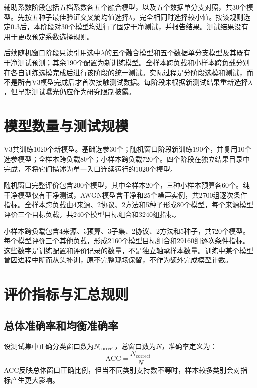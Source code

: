 \documentclass[UTF8,12pt,openany,twoside]{ctexbook}
\numberwithin{equation}{chapter}
\begin{document}
辅助系数阶段包括五档系数各五个融合模型，以及五个数据单分支对照，共30个模型。先按五种子最佳验证交叉熵均值选择\ensuremath{\lambda}，完全相同时选择较小值。按该规则选定0.3后，本阶段对30个模型均进行了固定干净测试，并报告结果。测试结果没有用于更改预定系数选择规则。

后续随机窗口阶段只读引用选中\ensuremath{\lambda}的五个融合模型和五个数据单分支模型及其既有干净测试预测；其余190个配置为新训练模型。全样本跨负载和小样本跨负载分别在各自训练选模完成后进行该阶段的统一测试。实际过程是分阶段选模和测试，而不是所有V3模型完成后才首次接触测试数据。每阶段未根据新测试结果重新选择\ensuremath{\lambda}，但早期测试曝光仍应作为研究限制披露。

\section{模型数量与测试规模}\label{ux6a21ux578bux6570ux91cfux4e0eux6d4bux8bd5ux89c4ux6a21}

V3共训练1020个新模型。基础选参30个；随机窗口阶段新训练190个，并复用10个选参模型；全样本跨负载80个；小样本跨负载720个。四个阶段在独立结果目录中完成，不将它们描述为单一入口连续运行的1020个模型。

随机窗口完整评价包含200个模型，其中全样本20个，三种小样本预算各60个。纯干净模型仅有干净测试，AWGN模型含干净和25个噪声实例，共2700组逐次条件指标。全样本跨负载由4来源、2协议、2方法和5种子形成80个模型，每个来源模型评价三个目标负载，共240个模型目标组合和3240组指标。

小样本跨负载包含4来源、3预算、3子集、2协议、2方法和5种子，共720个模型。每个模型评价三个其他负载，形成2160个模型目标组合和29160组逐次条件指标。这些数字是训练配置和评价记录的数量，不是独立轴承样本数量。训练中某个模型曾因进程中断而从头补训，原不完整现场保留，不作为额外完成模型计数。

\section{评价指标与汇总规则}\label{ux8bc4ux4ef7ux6307ux6807ux4e0eux6c47ux603bux89c4ux5219}

\subsection{总体准确率和均衡准确率}\label{ux603bux4f53ux51c6ux786eux7387ux548cux5747ux8861ux51c6ux786eux7387}

设测试集中正确分类窗口数为$N_{\mathrm{correct}}$，总窗口数为$N$，准确率定义为：
\begin{equation}
\label{eq:auto16}
\mathrm{ACC}=\frac{N_{\mathrm{correct}}}{N}
\end{equation}
ACC反映总体窗口正确比例，但当不同类别支持数不等时，样本较多类别会对指标产生更大影响。
\end{document}
